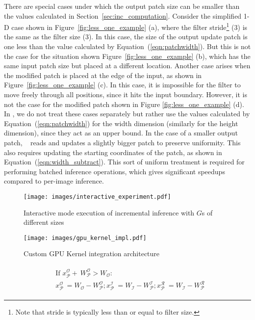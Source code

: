 There are special cases under which the output patch size can be smaller than the values calculated in Section~\ref{sec:inc_computation}. Consider the simplified 1-D case shown in Figure~\ref{fig:less_one_example} (a), where the filter stride\footnote{Note that stride is typically less than or equal to filter size.} (3) is the same as the filter size (3). In this case, the size of the output update patch is one less than the value calculated by Equation~(\ref{eqn:patchwidth}). But this is not the case for the situation shown Figure~\ref{fig:less_one_example} (b), which has the same input patch size but placed at a different location.
Another case arises when the modified patch is placed at the edge of the input, as shown in Figure~\ref{fig:less_one_example} (c). In this case, it is impossible for the filter to move freely through all positions, since it hits the input boundary. However, it is not the case for the modified patch shown in Figure \ref{fig:less_one_example} (d). In \system, we do not treat these cases separately but rather use the values calculated by Equation~(\ref{eqn:patchwidth}) for the width dimension (similarly for the height dimension), since they act as an upper bound. In the case of a smaller output patch, \system~ reads and updates a slightly bigger patch to preserve uniformity. This also requires updating the starting coordinates of the patch, as shown in Equation~(\ref{eqn:width_subtract}). This sort of uniform treatment is required for performing batched inference operations, which gives significant speedups compared to per-image inference.

\begin{figure}[t]
\texttt{[image: images/interactive\_experiment.pdf]}
\vspace{-8mm}
\caption{Interactive mode execution of incremental inference with $G$s of different sizes}
\label{fig:interactive_experiment}
\end{figure}


\begin{figure}[t]
\texttt{[image: images/gpu\_kernel\_impl.pdf]}
\vspace{-6mm}
\caption{Custom GPU Kernel integration architecture}
\label{fig:custom_kernel_integration}
\end{figure}



\vspace{-4mm}
\begin{align}
\begin{split}
\label{eqn:width_subtract}
&\text{If~} x^\mathcal{O}_\mathcal{P} + ~W^\mathcal{O}_\mathcal{P} > W_{\mathcal{O}}:\\
&x^\mathcal{O}_\mathcal{P} ~ =  W_{\mathcal{O}} - W^\mathcal{O}_\mathcal{P}; 
x^\mathcal{I}_\mathcal{P} ~ = W_{\mathcal{I}} - W^\mathcal{I}_\mathcal{P}; 
x^\mathcal{R}_\mathcal{P} ~ = W_{\mathcal{I}} - W^\mathcal{R}_\mathcal{P}
\end{split}
\end{align}

